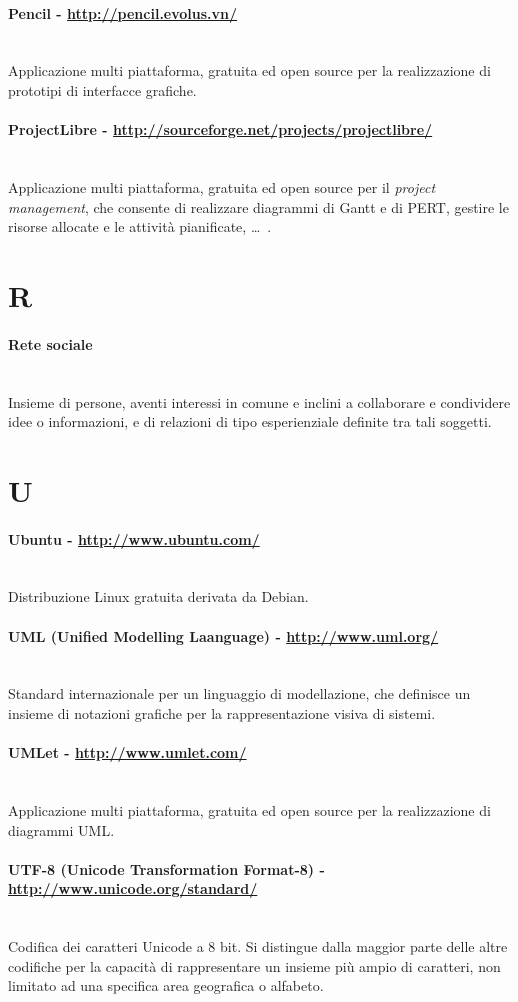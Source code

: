 \documentclass[11pt,a4paper,headsepline,hidelinks]{scrreprt} %
\begin{document}
	\paragraph{Pencil - \url{http://pencil.evolus.vn/}} \hfill \\
	Applicazione multi piattaforma, gratuita ed open source per la realizzazione di prototipi di interfacce grafiche.
	\paragraph{ProjectLibre - \url{http://sourceforge.net/projects/projectlibre/}} \hfill \\
	Applicazione multi piattaforma, gratuita ed open source per il \textit{project management}, che consente di realizzare diagrammi di Gantt e di PERT, gestire le risorse allocate e le attività pianificate, \ldots\ .

	\section*{R}
	\paragraph{Rete sociale} \hfill \\
	Insieme di persone, aventi interessi in comune e inclini a collaborare e condividere idee o informazioni, e di relazioni di tipo esperienziale definite tra tali soggetti.

	\section*{U}
	\paragraph{Ubuntu - \url{http://www.ubuntu.com/}} \hfill \\
	Distribuzione Linux gratuita derivata da Debian.
	\paragraph{UML (Unified Modelling Laanguage) - \url{http://www.uml.org/}} \hfill \\
	Standard internazionale per un linguaggio di modellazione, che definisce un insieme di notazioni grafiche per la rappresentazione visiva di sistemi.
	\paragraph{UMLet - \url{http://www.umlet.com/}} \hfill \\
	Applicazione multi piattaforma, gratuita ed open source per la realizzazione di diagrammi UML.
	\paragraph{UTF-8 (Unicode Transformation Format-8) - \url{http://www.unicode.org/standard/}} \hfill \\
	Codifica dei caratteri Unicode a 8 bit. Si distingue dalla maggior parte delle altre codifiche per la capacità di rappresentare un insieme più ampio di caratteri, non limitato ad una specifica area geografica o alfabeto.
\end{document}
